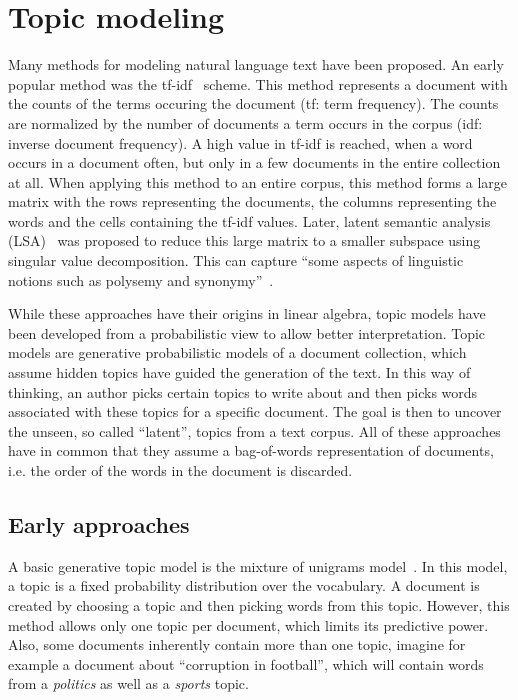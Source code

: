 \documentclass[
        a4paper,
        titlepage,
        twoside,
        parskip
        ]{scrbook}
\theoremstyle{break}
\begin{document}
\section{Topic modeling}
Many methods for modeling natural language text have been proposed.
An early popular method was the tf-idf~\cite{SparckJones1972} scheme.
This method represents a document with the counts of the terms occuring the document (tf: term frequency).
The counts are normalized by the number of documents a term occurs in the corpus (idf: inverse document frequency).
A high value in tf-idf is reached, when a word occurs in a document often, but only in a few documents in the entire collection at all.
When applying this method to an entire corpus, this method forms a large matrix with the rows representing the documents, the columns representing the words and the cells containing the tf-idf values.
Later, latent semantic analysis (LSA)~\cite{Deerwester1990} was proposed to reduce this large matrix to a smaller subspace using singular value decomposition.
This can capture ``some aspects of linguistic notions such as polysemy and synonymy''~\cite{Blei2003}.

While these approaches have their origins in linear algebra, topic models have been developed from a probabilistic view to allow better interpretation.
Topic models are generative probabilistic models of a document collection, which assume hidden topics have guided the generation of the text.
In this way of thinking, an author picks certain topics to write about and then picks words associated with these topics for a specific document.
The goal is then to uncover the unseen, so called ``latent'', topics from a text corpus.
All of these approaches have in common that they assume a bag-of-words representation of documents, i.e. the order of the words in the document is discarded.

\subsection{Early approaches}
A basic generative topic model is the mixture of unigrams model~\cite{Nigam2000}.
In this model, a topic is a fixed probability distribution over the vocabulary.
A document is created by choosing a topic and then picking words from this topic.
However, this method allows only one topic per document, which limits its predictive power.
Also, some documents inherently contain more than one topic, imagine for example a document about ``corruption in football'', which will contain words from a \emph{politics} as well as a \emph{sports} topic.
\end{document}
